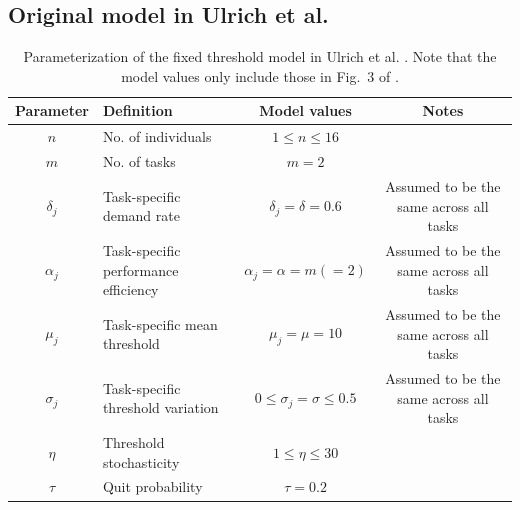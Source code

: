 \documentclass[11pt]{article}
\begin{document}
\subsection{Original model in Ulrich et al. \cite{ulrich2018}}
\begin{table}[h!] \small
  \begin{center}
    \begin{tabular}{|c|>{\centering}p{2.05in}|c|c|} 
      \hline
      \textbf{Parameter} & \textbf{Definition} & \textbf{Model values} & \textbf{Notes} \\ \hline
      $n$ & No. of individuals & $1\leq n \leq16$ & \\ \hline
      $m$ & No. of tasks & $m = 2$ & \\ \hline
      $\delta_j$ & Task-specific demand rate & $\delta_j = \delta = 0.6$ & Assumed to be the same across all tasks \\ \hline
      $\alpha_j$ & Task-specific performance efficiency & $\alpha_j = \alpha = m(=2) $ & Assumed to be the same across all tasks \\ \hline
      $\mu_j$ & Task-specific mean threshold & $\mu_j = \mu = 10$ & Assumed to be the same across all tasks \\ \hline
      $\sigma_j$ & Task-specific threshold variation & $0 \leq \sigma_j = \sigma \leq 0.5$ & Assumed to be the same across all tasks \\ \hline
      $\eta$ & Threshold stochasticity & $1 \leq \eta \leq 30 $ & \\ \hline
      $\tau$ & Quit probability & $\tau = 0.2$ & \\ \hline
    \end{tabular}
    \caption{Parameterization of the fixed threshold model in Ulrich et al. \cite{ulrich2018}. Note that the model values only include those in Fig.~3 of \cite{ulrich2018}.}
    \label{tab:table1}
  \end{center}
\end{table}

\newpage
\end{document}
